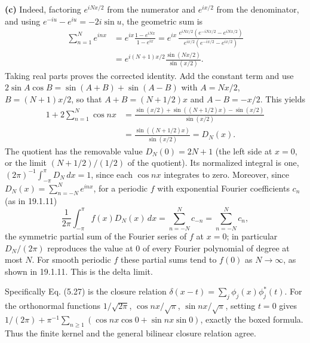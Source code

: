 \textbf{(c)} 
Indeed, factoring $e^{iNx/2}$ from the numerator and $e^{ix/2}$ from
the denominator, and using $e^{-iu}-e^{iu}=-2i\sin u$, the geometric
sum is
\begin{align*}
\sum_{n=1}^Ne^{inx}
&=e^{ix}\frac{1-e^{iNx}}{1-e^{ix}}
=e^{ix}\,\frac{e^{iNx/2}(e^{-iNx/2}-e^{iNx/2})}
{e^{ix/2}(e^{-ix/2}-e^{ix/2})}\\
&=e^{i(N+1)x/2}\frac{\sin(Nx/2)}{\sin(x/2)}.
\end{align*}
Taking real parts proves the corrected identity. Add the constant
term and use $2\sin A\cos B=\sin(A+B)+\sin(A-B)$ with $A=Nx/2$,
$B=(N+1)x/2$, so that $A+B=(N+1/2)x$ and $A-B=-x/2$. This yields
\begin{align*}
1+2\sum_{n=1}^N\cos nx
&=\frac{\sin(x/2)+\sin((N+1/2)x)-\sin(x/2)}{\sin(x/2)}\\
&=\frac{\sin((N+1/2)x)}{\sin(x/2)}=D_N(x).
\end{align*}
The quotient has the removable value $D_N(0)=2N+1$ (the left side at
$x=0$, or the limit $(N+1/2)/(1/2)$ of the quotient).
Its normalized integral is one,
$(2\pi)^{-1}\int_{-\pi}^{\pi}D_N\,dx=1$, since each $\cos nx$
integrates to zero. Moreover, since
$D_N(x)=\sum_{n=-N}^Ne^{inx}$, for a periodic $f$ with exponential
Fourier coefficients $c_n$ (as in 19.1.11)
\[
\frac1{2\pi}\int_{-\pi}^{\pi}f(x)D_N(x)\,dx=\sum_{n=-N}^Nc_{-n}
=\sum_{n=-N}^Nc_n,
\]
the symmetric partial sum of the Fourier series of $f$ at $x=0$; in
particular $D_N/(2\pi)$ reproduces the value at $0$ of every Fourier
polynomial of degree at most $N$. For smooth periodic $f$ these
partial sums tend to $f(0)$ as $N\to\infty$, as shown in 19.1.11.
This is the delta limit.

Specifically Eq. (5.27) is the closure relation
$\delta(x-t)=\sum_j\phi_j(x)\phi_j^*(t)$.
For the orthonormal functions
$1/\sqrt{2\pi}$, $\cos nx/\sqrt\pi$, $\sin nx/\sqrt\pi$,
setting $t=0$ gives
$1/(2\pi)+\pi^{-1}\sum_{n\ge1}(\cos nx\cos0+\sin nx\sin0)$,
exactly the boxed formula. Thus the finite kernel
and the general bilinear closure relation agree.

